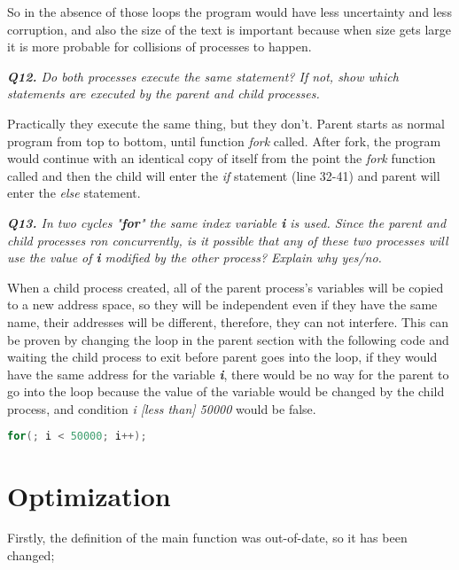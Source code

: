 \documentclass[11pt]{article}
\begin{document}
So in the absence of those loops the program would have less uncertainty and less corruption, and also the size of the text is important because when size gets large it is more probable for collisions of processes to happen.



\vspace{5mm}
\textit{\textbf{Q12.} Do both processes execute the same statement? If not, show which statements are executed by the parent and child processes.}
\vspace{5mm}

Practically they execute the same thing, but they don't. Parent starts as normal program from top to bottom, until function \textit{fork} called. After fork, the program would continue with an identical copy of itself from the point the \textit{fork} function called and then the child will enter the \textit{if} statement (line 32-41) and parent will enter the \textit{else} statement.

\vspace{5mm}
\textit{\textbf{Q13.} In two cycles "\textbf{for}" the same index variable \textit{\textbf{i}} is used. Since the parent and child processes ron concurrently, is it possible that any of these two processes will use the value of \textit{\textbf{i}} modified by the other process? Explain why yes/no.}
\vspace{5mm}

When a child process created, all of the parent process's variables will be copied to a new address space, so they will be independent even if they have the same name, their addresses will be different, therefore, they can not interfere. This can be proven by changing the loop in the parent section with the following code and waiting the child process to exit before parent goes into the loop, if they would have the same address for the variable \textit{\textbf{i}}, there would be no way for the parent to go into the loop because the value of the variable would be changed by the child process, and condition \textit{i [less than] 50000} would be false.

\begin{lstlisting}[language=C]
	for(; i < 50000; i++);
\end{lstlisting}

\section*{Optimization}

Firstly, the definition of the main function was out-of-date, so it has been changed;
\end{document}
